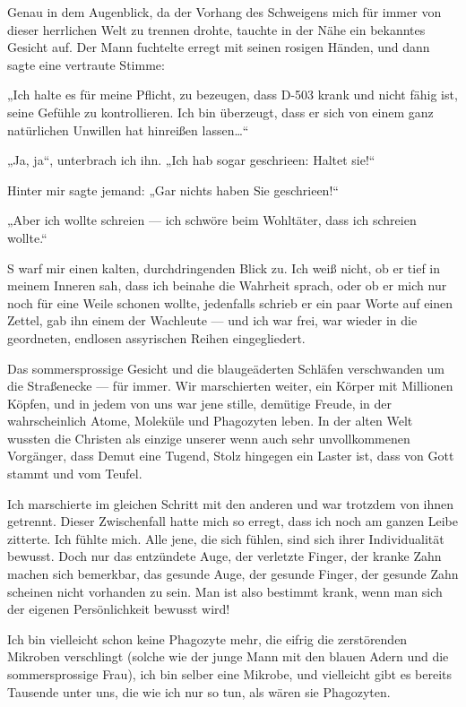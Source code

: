 Genau in dem Augenblick, da der Vorhang des Schweigens mich für
immer von dieser herrlichen Welt zu trennen drohte, tauchte in der
Nähe ein bekanntes Gesicht auf. Der Mann fuchtelte erregt mit
seinen rosigen Händen, und dann sagte eine vertraute Stimme:

„Ich halte es für meine Pflicht, zu bezeugen, dass D-503 krank und
nicht fähig ist, seine Gefühle zu kontrollieren. Ich bin überzeugt,
dass er sich von einem ganz natürlichen Unwillen hat hinreißen
lassen\ldots{}“

„Ja, ja“, unterbrach ich ihn. „Ich hab sogar geschrieen: Haltet
sie!“

Hinter mir sagte jemand: „Gar nichts haben Sie geschrieen!“

„Aber ich wollte schreien — ich schwöre beim Wohltäter, dass ich
schreien wollte.“

S warf mir einen kalten, durchdringenden Blick zu. Ich weiß nicht,
ob er tief in meinem Inneren sah, dass ich beinahe die Wahrheit
sprach, oder ob er mich nur noch für eine Weile schonen wollte,
jedenfalls schrieb er ein paar Worte auf einen Zettel, gab ihn
einem der Wachleute — und ich war frei, war wieder in die
geordneten, endlosen assyrischen Reihen eingegliedert.

\bigpar %
Das sommersprossige Gesicht und die blaugeäderten Schläfen
verschwanden um die Straßenecke — für immer. Wir marschierten
weiter, ein Körper mit Millionen Köpfen, und in jedem von uns war
jene stille, demütige Freude, in der wahrscheinlich Atome, Moleküle
und Phagozyten leben. In der alten Welt wussten die Christen als
einzige unserer wenn auch sehr unvollkommenen Vorgänger, dass Demut
eine Tugend, Stolz hingegen ein Laster ist, dass  von Gott
stammt und  vom Teufel.

Ich marschierte im gleichen Schritt mit
den anderen und war trotzdem von ihnen getrennt. Dieser
Zwischenfall hatte mich so erregt, dass ich noch am ganzen Leibe
zitterte. Ich fühlte mich. Alle jene, die sich fühlen, sind sich
ihrer Individualität bewusst. Doch nur das entzündete Auge, der
verletzte Finger, der kranke Zahn machen sich
bemerkbar, das gesunde Auge, der gesunde Finger, der gesunde Zahn
scheinen nicht vorhanden zu sein. Man ist also bestimmt krank, wenn
man sich der eigenen Persönlichkeit bewusst wird!

Ich bin vielleicht schon keine Phagozyte mehr, die eifrig die
zerstörenden Mikroben verschlingt (solche wie der junge Mann mit
den blauen Adern und die sommersprossige Frau), ich bin selber eine
Mikrobe, und vielleicht gibt es bereits Tausende unter uns, die wie
ich nur so tun, als wären sie Phagozyten.

